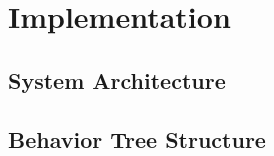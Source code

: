 \chapter{Implementation}
\label{cha:implementierung}

\section{System Architecture}

\section{Behavior Tree Structure}



